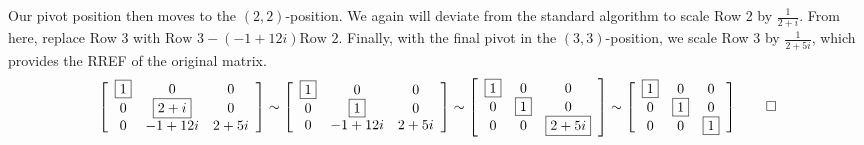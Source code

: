 \begin{Exam}
Our pivot position then moves to the $(2,2)$-position. We again will deviate from the standard algorithm to scale Row 2 by $\frac{1}{2+i}$. From here, replace Row 3 with $\text{Row 3} - (-1+12i)\text{Row 2}$. Finally, with the final pivot in the $(3,3)$-position, we scale Row 3 by $\frac{1}{2+5i}$, which provides the RREF of the original matrix.
\[\mtx{ccc}{\fbox{$1$} & 0 & 0 \\ 0 & \fbox{$2+i$} & 0\\ 0 & -1+12i & 2+5i} \sim \mtx{ccc}{\fbox{$1$} & 0 & 0 \\ 0 & \fbox{$1$} & 0\\ 0 & -1+12i & 2+5i}\sim \mtx{ccc}{\fbox{$1$} & 0 & 0 \\ 0 & \fbox{$1$} & 0\\ 0 & 0 & \fbox{$2+5i$}} \sim \mtx{ccc}{\fbox{$1$} & 0 & 0 \\ 0 & \fbox{$1$} & 0\\ 0 & 0 & \fbox{$1$}} \qedhere\]
\end{Exam}


